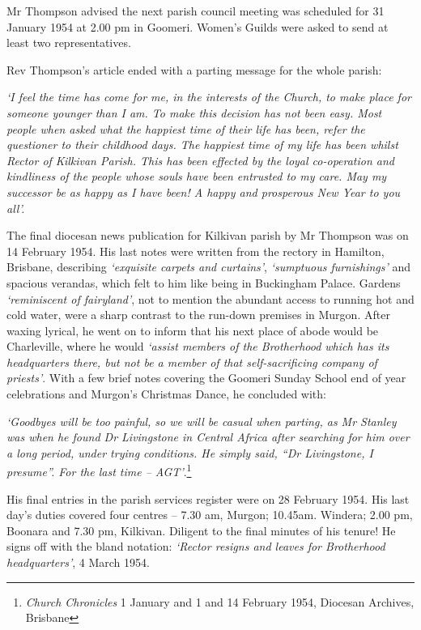 Mr Thompson advised the next parish council meeting was scheduled for 31 January 1954 at 2.00 pm in Goomeri. Women's Guilds were asked to send at least two representatives.



Rev Thompson's article ended with a parting message for the whole parish:



\emph{`I feel the time has come for me, in the interests of the Church, to make place for someone younger than I am. To make this decision has not been easy. Most people when asked what the happiest time of their life has been, refer the questioner to their childhood days. The happiest time of my life has been whilst Rector of Kilkivan Parish. This has been effected by the loyal co-operation and kindliness of the people whose souls have been entrusted to my care. May my successor be as happy as I have been! A happy and prosperous New Year to you all'.}



The final diocesan news publication for Kilkivan parish by Mr Thompson was on 14 February 1954. His last notes were written from the rectory in Hamilton, Brisbane, describing \emph{`exquisite carpets and curtains'}, \emph{`sumptuous furnishings'} and spacious verandas, which felt to him like being in Buckingham Palace. Gardens \emph{`reminiscent of fairyland'}, not to mention the abundant access to running hot and cold water, were a sharp contrast to the run-down premises in Murgon. After waxing lyrical, he went on to inform that his next place of abode would be Charleville, where he would \emph{`assist members of the Brotherhood which has its headquarters there, but not be a member of that self-sacrificing company of priests'}. With a few brief notes covering the Goomeri Sunday School end of year celebrations and Murgon's Christmas Dance, he concluded with:



\emph{`Goodbyes will be too painful, so we will be casual when parting, as Mr Stanley was when he found Dr Livingstone in Central Africa after searching for him over a long period, under trying conditions. He simply said, ``Dr Livingstone, I presume''. For the last time -- AGT'}.\footnote{\emph{Church Chronicles} 1 January and 1 and 14 February 1954, Diocesan Archives, Brisbane}


\smallskip


His final entries in the parish services register were on 28 February 1954. His last day's duties covered four centres -- 7.30 am, Murgon; 10.45am. Windera; 2.00 pm, Boonara and 7.30 pm, Kilkivan. Diligent to the final minutes of his tenure! He signs off with the bland notation: \emph{`Rector resigns and leaves for Brotherhood headquarters'}, 4 March 1954.



